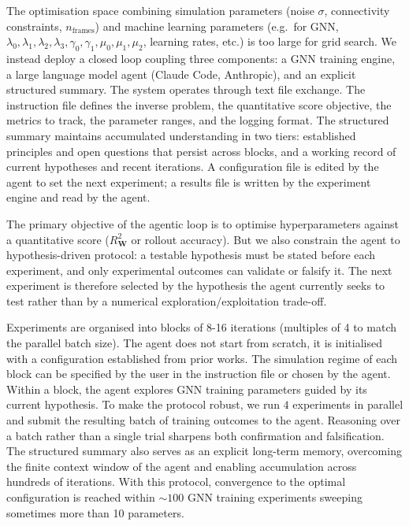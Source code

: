 \documentclass{article}
\begin{document}
The optimisation space combining simulation parameters (noise $\sigma$,
connectivity constraints, $n_{\mathrm{frames}}$) and machine learning parameters
(e.g.\ for GNN, $\lambda_0,\lambda_1,\lambda_2,\lambda_3,\gamma_0,\gamma_1,\mu_0,\mu_1,\mu_2$, learning rates, etc.) is too large for grid search. We instead deploy a closed loop
coupling three components: a GNN training engine, a large language model
agent (Claude Code, Anthropic), and an explicit structured summary. The system
operates through text file exchange. The instruction file defines the inverse
problem, the quantitative score objective, the metrics to track, the parameter
ranges, and the logging format. The structured summary maintains accumulated
understanding in two tiers: established principles and open questions that
persist across blocks, and a working record of current hypotheses and recent
iterations. A configuration file is edited by the agent to set the next
experiment; a results file is written by the experiment engine and read by
the agent.

The primary objective of the agentic loop is to optimise hyperparameters
against a quantitative score ($R^2_{\mathbf{W}}$ or rollout accuracy). But we
also constrain the agent to hypothesis-driven protocol: a testable
hypothesis must be stated before each experiment, and only experimental
outcomes can validate or falsify it. The next experiment is therefore
selected by the hypothesis the agent currently seeks to test rather than by a
numerical exploration/exploitation trade-off.

Experiments are organised into blocks of 8-16 iterations (multiples of 4 to
match the parallel batch size). The agent does not start from scratch, it is initialised with a configuration established from prior works. The simulation
regime of each block can be specified by the user in the instruction file or
chosen by the agent. Within a block, the agent explores GNN training
parameters guided by its current hypothesis. To make the protocol robust, we
run $4$ experiments in parallel and submit the resulting batch of training
outcomes to the agent. Reasoning over a batch rather than a single trial
sharpens both confirmation and falsification. The structured summary also
serves as an explicit long-term memory, overcoming the finite context window
of the agent and enabling accumulation across hundreds of iterations. With
this protocol, convergence to the optimal configuration is reached within
$\sim 100$ GNN training experiments sweeping sometimes more than 10 parameters.
\end{document}
